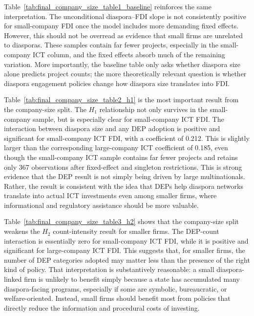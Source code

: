 \documentclass[doublespace,nopageskip]{UVAthesis}
\begin{document}


Table~\ref{tab:final_company_size_table1_baseline} reinforces the same interpretation. The unconditional diaspora--FDI slope is not consistently positive for small-company FDI once the model includes more demanding fixed effects. However, this should not be overread as evidence that small firms are unrelated to diasporas. These samples contain far fewer projects, especially in the small-company ICT column, and the fixed effects absorb much of the remaining variation. More importantly, the baseline table only asks whether diaspora size alone predicts project counts; the more theoretically relevant question is whether diaspora engagement policies change how diaspora size translates into FDI.



Table~\ref{tab:final_company_size_table2_h1} is the most important result from the company-size split. The $H_1$ relationship not only survives in the small-company sample, but is especially clear for small-company ICT FDI. The interaction between diaspora size and any DEP adoption is positive and significant for small-company ICT FDI, with a coefficient of 0.212. This is slightly larger than the corresponding large-company ICT coefficient of 0.185, even though the small-company ICT sample contains far fewer projects and retains only 367 observations after fixed-effect and singleton restrictions. This is strong evidence that the DEP result is not simply being driven by large multinationals. Rather, the result is consistent with the idea that DEPs help diaspora networks translate into actual ICT investments even among smaller firms, where informational and regulatory assistance should be more valuable.



Table~\ref{tab:final_company_size_table3_h2} shows that the company-size split weakens the $H_2$ count-intensity result for smaller firms. The DEP-count interaction is essentially zero for small-company ICT FDI, while it is positive and significant for large-company ICT FDI. This suggests that, for smaller firms, the number of DEP categories adopted may matter less than the presence of the right kind of policy. That interpretation is substantively reasonable: a small diaspora-linked firm is unlikely to benefit simply because a state has accumulated many diaspora-facing programs, especially if some are symbolic, bureaucratic, or welfare-oriented. Instead, small firms should benefit most from policies that directly reduce the information and procedural costs of investing.
\end{document}
